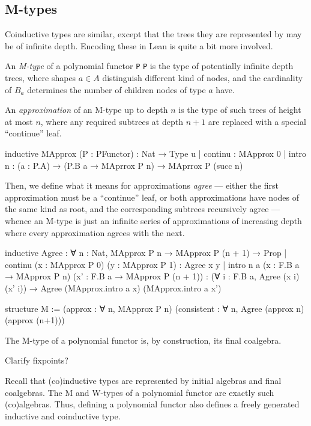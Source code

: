 \documentclass[titlepage]{report}
\newenvironment{todo}{%
\definecolor{shadecolor}{HTML}{F8E0E0}%
\begin{shaded}%
\begin{trivlist}                         
    \item[\hskip \labelsep {\bfseries Todo:}]}{\end{trivlist}\end{shaded}}
\newcommand\lean[1]{%
\ifx\leanmode\undefined%
\def\leanmode{1}%
\texttt{\small #1}%
\undef\leanmode%
\else%
\texttt{#1}%
\fi%
}
\begin{document}
\subsection*{M-types}
Coinductive types are similar, except that the trees they are represented by may be of infinite depth. Encoding these in Lean is quite a bit more involved.

An \emph{M-type} of a polynomial functor \lean{P} is the type of potentially infinite depth trees, where shapes $a ∈ A$ distinguish different kind of nodes, and the cardinality of $B_a$ determines the number of children nodes of type $a$ have.

An \emph{approximation} of an M-type up to depth $n$ is the type of such trees of height at most $n$, where any required subtrees at depth $n+1$ are replaced with a special ``continue'' leaf. 

\begin{leancode}
  inductive MApprox (P : PFunctor) : Nat → Type u
  | continu : MApprox 0
  | intro {n} : (a : P.A) → (P.B a → MAprrox P n) → MAprrox P (succ n)
\end{leancode}

Then, we define what it means for approximations \emph{agree} --- either the first approximation must be a ``continue'' leaf, or both approximations have nodes of the same kind as root, and the corresponding subtrees recursively agree --- whence an M-type is just an infinite series of approximations of increasing depth where every approximation agrees with the next.

\begin{leancode}
  inductive Agree : ∀ {n : Nat}, MApprox P n → MApprox P (n + 1) → Prop
  | continu (x : MApprox P 0) (y : MApprox P 1) : Agree x y
  | intro {n} {a}   (x  : F.B a → MApprox P n) 
                    (x' : F.B a → MApprox P (n + 1)) 
                    : (∀ i : F.B a, Agree (x i) (x' i))
                    → Agree (MApprox.intro a x) (MApprox.intro a x')

  structure M := 
    (approx : ∀ n, MApprox P n) (consistent : ∀ n, Agree (approx n) (approx (n+1)))
\end{leancode}

The M-type of a polynomial functor is, by construction, its final coalgebra.

\begin{todo}

    Clarify fixpoints?

    Recall that (co)inductive types are represented by initial algebras and final coalgebras. The M and W-types of a polynomial functor are exactly such (co)algebras. Thus, defining a polynomial functor also defines a freely generated inductive and coinductive type.

\end{todo}
\end{document}

